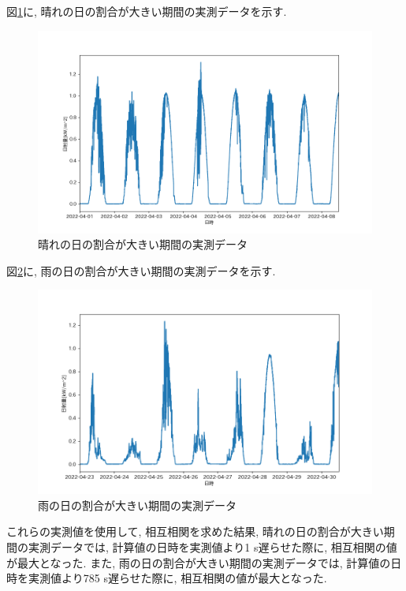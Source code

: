 \documentclass[a4j,12pt,]{jarticle}
\begin{document}
図\ref{p3}に, 晴れの日の割合が大きい期間の実測データを示す.

\begin{figure}[H]
  \begin{center}
    \includegraphics[width=160mm]{3.png}
    \caption{晴れの日の割合が大きい期間の実測データ}
    \label{p3}
  \end{center}
\end{figure}

図\ref{p4}に, 雨の日の割合が大きい期間の実測データを示す.

\begin{figure}[H]
  \begin{center}
    \includegraphics[width=160mm]{4.png}
    \caption{雨の日の割合が大きい期間の実測データ}
    \label{p4}
  \end{center}
\end{figure}

これらの実測値を使用して, 相互相関を求めた結果, 晴れの日の割合が大きい期間の実測データでは, 計算値の日時を実測値より1 \si{\second}遅らせた際に, 相互相関の値が最大となった.
また,  雨の日の割合が大きい期間の実測データでは, 計算値の日時を実測値より785 \si{\second}遅らせた際に, 相互相関の値が最大となった.
\end{document}
